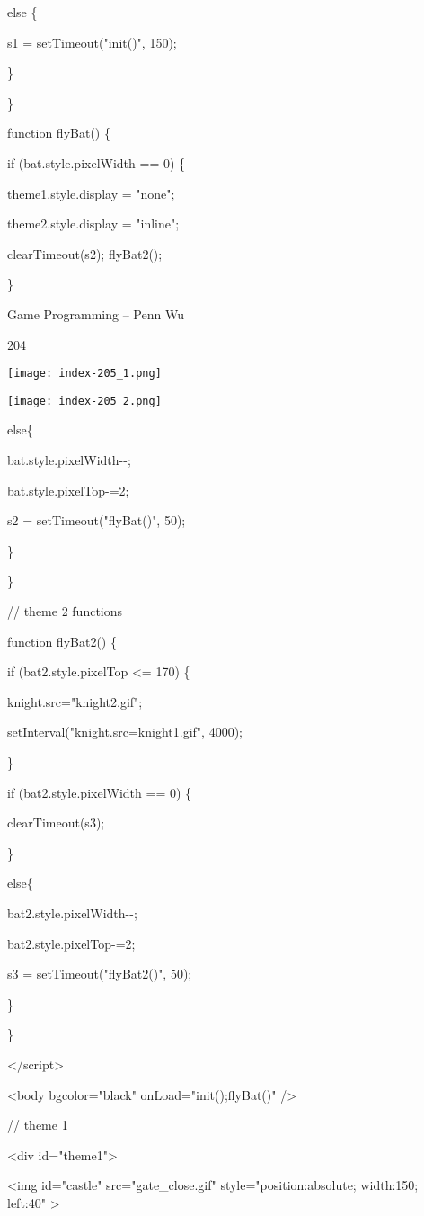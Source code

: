 \documentclass[
]{article}
\begin{document}
else \{

s1 = setTimeout("init()", 150);

\}

\}

function flyBat() \{

if (bat.style.pixelWidth == 0) \{

theme1.style.display = "none";

theme2.style.display = "inline";

clearTimeout(s2); flyBat2();

\}

Game Programming -- Penn Wu

204

\protect\hypertarget{index_split_011.htmlux5cux23p205}{}{}\texttt{[image: index-205\_1.png]}

\texttt{[image: index-205\_2.png]}

else\{

bat.style.pixelWidth-\/-;

bat.style.pixelTop-=2;

s2 = setTimeout("flyBat()", 50);

\}

\}

// theme 2 functions

function flyBat2() \{

if (bat2.style.pixelTop \textless= 170) \{

knight.src="knight2.gif";

setInterval("knight.src=\textquotesingle knight1.gif\textquotesingle",
4000);

\}

if (bat2.style.pixelWidth == 0) \{

clearTimeout(s3);

\}

else\{

bat2.style.pixelWidth-\/-;

bat2.style.pixelTop-=2;

s3 = setTimeout("flyBat2()", 50);

\}

\}

\textless/script\textgreater{}

\textless body bgcolor="black" onLoad="init();flyBat()" /\textgreater{}

// theme 1

\textless div id="theme1"\textgreater{}

\textless img id="castle" src="gate\_close.gif"
style="position:absolute; width:150; left:40" \textgreater{}
\end{document}
